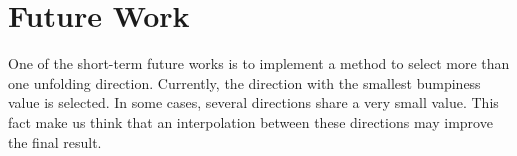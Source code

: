 \section{Future Work}
\label{conclusions:future_work}
One of the short-term future works is to implement a method to select more than one unfolding direction. Currently, the direction with the smallest bumpiness value is selected. In some cases, several directions share a very small value. This fact make us think that an interpolation between these directions may improve the final result. 